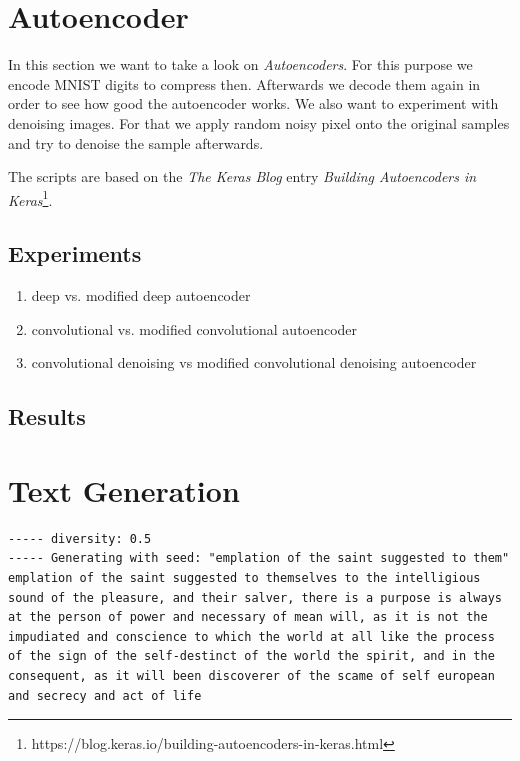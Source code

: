 \documentclass{article}[]
\begin{document}
\section{Autoencoder}
\label{sec:autoencoder}
In this section we want to take a look on \emph{Autoencoders}.
For this purpose we encode MNIST digits to compress then.
Afterwards we decode them again in order to see how good the autoencoder works.
We also want to experiment with denoising images.
For that we apply random noisy pixel onto the original samples and try to denoise the sample afterwards.

The scripts are based on the \emph{The Keras Blog} entry \emph{Building Autoencoders in Keras}\footnote{https://blog.keras.io/building-autoencoders-in-keras.html}.

\subsection{Experiments}

\begin{enumerate}
	\item{deep vs. modified deep autoencoder}
	\item{convolutional vs. modified convolutional autoencoder}
	\item{convolutional denoising vs modified convolutional denoising autoencoder}
\end{enumerate}

\subsection{Results}




\appendix
\section{Text Generation}
\begin{lstlisting}[label=nietzsche-low-diverse, caption={riginal script with Nietzsche after 60 epochs and a diversity of 0.5}]
----- diversity: 0.5
----- Generating with seed: "emplation of the saint suggested to them"
emplation of the saint suggested to themselves to the intelligious sound of the pleasure, and their salver, there is a purpose is always at the person of power and necessary of mean will, as it is not the impudiated and conscience to which the world at all like the process of the sign of the self-destinct of the world the spirit, and in the consequent, as it will been discoverer of the scame of self european and secrecy and act of life 
\end{lstlisting}
\end{document}
